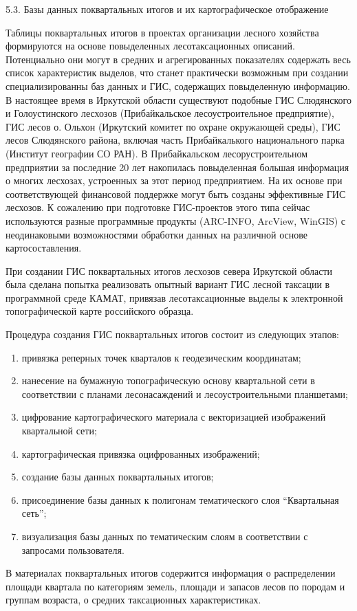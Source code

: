 \documentclass{report}
\begin{document}
5.3. Базы данных поквартальных итогов и их картографическое отображение

Таблицы поквартальных итогов в проектах организации лесного хозяйства формируются на основе повыделенных
лесотаксационных описаний. Потенциально они могут в средних и агрегированных показателях содержать весь список
характеристик выделов, что станет практически возможным при создании специализированны баз данных и ГИС, содержащих
повыделенную информацию. В настоящее время в Иркутской области существуют подобные ГИС Слюдянского и Голоустинского
лесхозов (Прибайкальское лесоустроительное предприятие), ГИС лесов о. Ольхон (Иркутский комитет по охране окружающей
среды), ГИС лесов Слюдянского района, включая часть Прибайкалького национального парка (Институт географии СО РАН).  В
Прибайкальском лесорустроительном предприятии за последние 20 лет накопилась повыделенная  большая информация о многих
лесхозах, устроенных за этот период предприятием. На их основе при соответствующей финансовой поддержке могут быть
созданы эффективные ГИС лесхозов. К сожалению при подготовке ГИС-проектов этого типа сейчас используются разные
программные продукты (ARC{}-INFO, ArcView, WinGIS) с неодинаковыми возможностями обработки данных на различной основе
картосоставления.  

При создании ГИС поквартальных итогов лесхозов севера Иркутской области была сделана попытка реализовать опытный вариант
ГИС лесной таксации в программной среде КАМАТ, привязав лесотаксационные выделы к электронной топографической карте
российского образца.  

Процедура создания ГИС поквартальных итогов состоит из следующих этапов: 

\begin{enumerate}
\item привязка реперных точек кварталов к геодезическим координатам; 
\item нанесение на бумажную топографическую основу квартальной сети в соответствии с планами лесонасаждений и
лесоустроительными планшетами; 
\item цифрование картографического материала с векторизацией изображений квартальной сети;
\item картографическая привязка оцифрованных изображений;  
\item создание базы данных поквартальных итогов; 
\item присоединение базы данных к полигонам тематического слоя “Квартальная сеть”; 
\item визуализация базы данных по тематическим слоям в соответствии с запросами пользователя.  
\end{enumerate}
В материалах поквартальных итогов содержится информация о распределении площади квартала по категориям земель, площади и
запасов лесов по породам и группам возраста, о средних таксационных характеристиках.  
\end{document}
